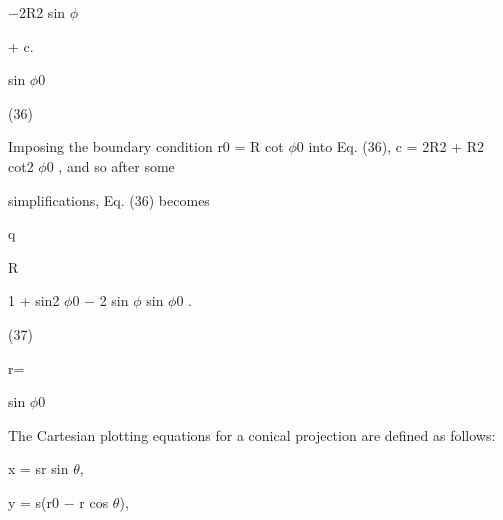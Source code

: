 \documentclass[a4paper,portrait,12pt]{article}
\begin{document}
\begin{flushleft}
$-$2R2 sin $\phi$
\end{flushleft}


\begin{flushleft}
+ c.
\end{flushleft}


\begin{flushleft}
sin $\phi$0
\end{flushleft}





(36)





\begin{flushleft}
Imposing the boundary condition r0 = R cot $\phi$0 into Eq. (36), c = 2R2 + R2 cot2 $\phi$0 , and so after some
\end{flushleft}


\begin{flushleft}
simplifications, Eq. (36) becomes
\end{flushleft}


\begin{flushleft}
q
\end{flushleft}


\begin{flushleft}
R
\end{flushleft}


\begin{flushleft}
1 + sin2 $\phi$0 $-$ 2 sin $\phi$ sin $\phi$0 .
\end{flushleft}


(37)


\begin{flushleft}
r=
\end{flushleft}


\begin{flushleft}
sin $\phi$0
\end{flushleft}


\begin{flushleft}
The Cartesian plotting equations for a conical projection are defined as follows:
\end{flushleft}


\begin{flushleft}
x = sr sin $\theta$,
\end{flushleft}





\begin{flushleft}
y = s(r0 $-$ r cos $\theta$),
\end{flushleft}
\end{document}

